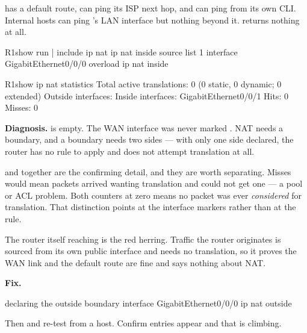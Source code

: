 \begin{breakfix}
 has a default route, can ping its ISP next hop, and can ping
 from its own CLI. Internal hosts can ping 's LAN interface
but nothing beyond it.  returns nothing at all.

\begin{verify}{R1}{show run | include ip nat}
ip nat inside source list 1 interface GigabitEthernet0/0/0 overload
 ip nat inside
\end{verify}

\begin{verify}{R1}{show ip nat statistics}
Total active translations: 0 (0 static, 0 dynamic; 0 extended)
Outside interfaces:
Inside interfaces:
  GigabitEthernet0/0/1
Hits: 0  Misses: 0
\end{verify}

\textbf{Diagnosis.}  is empty. The WAN interface was
never marked . NAT needs a boundary, and a boundary needs two
sides --- with only one side declared, the router has no rule to apply and does
not attempt translation at all.

 and  together are the confirming detail, and they are
worth separating. Misses would mean packets arrived wanting translation and could
not get one --- a pool or ACL problem. Both counters at zero means no packet was
ever \emph{considered} for translation. That distinction points at the interface
markers rather than at the rule.

The router itself reaching  is the red herring. Traffic the router
originates is sourced from its own public interface and needs no translation, so
it proves the WAN link and the default route are fine and says nothing about NAT.

\textbf{Fix.}

\begin{config}{declaring the outside boundary}
interface GigabitEthernet0/0/0
 ip nat outside
\end{config}

Then  and re-test from a host. Confirm entries
appear and that  is climbing.
\end{breakfix}

